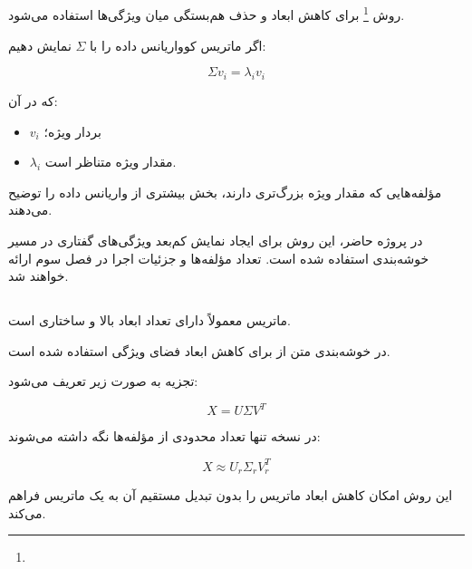 \subsection{}

روش
\footnote{}
برای کاهش ابعاد و حذف هم‌بستگی میان ویژگی‌ها استفاده می‌شود.

اگر ماتریس کوواریانس داده را با $\Sigma$ نمایش دهیم:

\begin{equation}
\Sigma v_i
=
\lambda_i v_i
\end{equation}

که در آن:

\begin{itemize}
	\item $v_i$ بردار ویژه؛
	\item $\lambda_i$ مقدار ویژه متناظر است.
\end{itemize}

مؤلفه‌هایی که مقدار ویژه بزرگ‌تری دارند، بخش بیشتری از واریانس داده را توضیح می‌دهند.

در پروژه حاضر، این روش برای ایجاد نمایش کم‌بعد ویژگی‌های گفتاری در مسیر خوشه‌بندی استفاده شده است. تعداد مؤلفه‌ها و جزئیات اجرا در فصل سوم ارائه خواهند شد.


\subsection{}

ماتریس
معمولاً دارای تعداد ابعاد بالا و ساختاری
است.

در خوشه‌بندی متن از
برای کاهش ابعاد فضای ویژگی استفاده شده است.

تجزیه
به صورت زیر تعریف می‌شود:

\begin{equation}
X
=
U\Sigma V^T
\end{equation}

در نسخه
تنها تعداد محدودی از مؤلفه‌ها نگه داشته می‌شوند:

\begin{equation}
X
\approx
U_r
\Sigma_r
V_r^T
\end{equation}

این روش امکان کاهش ابعاد ماتریس
را بدون تبدیل مستقیم آن به یک ماتریس
فراهم می‌کند.

